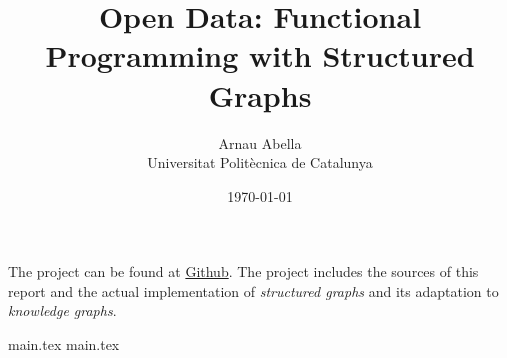 \documentclass[12pt, a4paper]{article}
\title{%
  \vspace{-10ex}
  Open Data: Functional Programming with Structured Graphs
}
\author{%
  Arnau Abella \\
  \large{Universitat Polit\`ecnica de Catalunya}
}
\date{\today}
\begin{document}
\maketitle

The project can be found at \href{https://github.com/monadplus/od-final-project}{Github}.
The project includes the sources of this report and the actual implementation of \emph{structured graphs} and its adaptation to \emph{knowledge graphs}.

{main.tex}
{main.tex}



\end{document}
